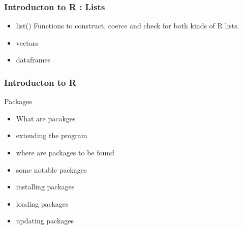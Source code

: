\documentclass{beamer}
\begin{document}
\begin{frame}[fragile]
\frametitle{Introducton to R :  Lists}


\begin{itemize}
   \item  list() Functions to construct, coerce and check for both kinds of R lists. 
 \item  vectors
 \item  dataframes
 \end{itemize}

\end{frame}
\begin{frame}[fragile]
\frametitle{Introducton to R}

Packages

\begin{itemize}
 \item  What are pacakges
\item  extending the program
 \item  where are packages to be found
 \item  some notable packages
 \item  installing packages
 \item  loading packages
 \item  updating packages
 \end{itemize}

\end{frame}
\end{document}
